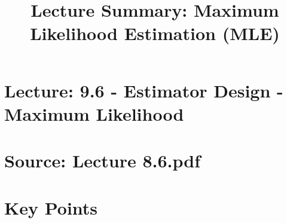 \documentclass{article}
\title{Lecture Summary: Maximum Likelihood Estimation (MLE)}
\author{}
\date{}
\begin{document}
\maketitle

\section*{Lecture: 9.6 - Estimator Design - Maximum Likelihood}
\section*{Source: Lecture 8.6.pdf}

\section*{Key Points}
\end{document}
